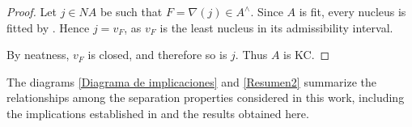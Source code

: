 \documentclass[11pt]{amsart}
\theoremstyle{plain}
\theoremstyle{definition}
\begin{document}
\begin{proof}
Let $j\in NA$ be such that
$F=\nabla(j)\in A^\wedge$.
Since $A$ is fit, every nucleus is fitted
by \cite[Theorem 3.4]{simmons2006regularity}. Hence
$j=v_F$, as $v_F$ is the least nucleus
in its admissibility interval.

By neatness, $v_F$ is closed, and therefore
so is $j$. Thus $A$ is KC.
\end{proof}

The diagrams \eqref{Diagrama de implicaciones} and \eqref{Resumen2} summarize the relationships among the separation properties considered in this work, including the implications 
established in \cite{picado2021separation} and the results obtained here.
\end{document}

